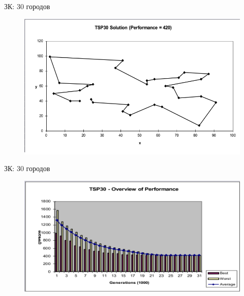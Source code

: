 \documentclass{beamer}
\begin{document}
\begin{frame}{ЗК: 30 городов}
\begin{figure}[h]
\centering
\includegraphics[scale=0.4]{images/lec04-pic46.png}
\end{figure}
\end{frame}

\begin{frame}{ЗК: 30 городов}
\begin{figure}[h]
\centering
\includegraphics[scale=0.4]{images/lec04-pic47.png}
\end{figure}
\end{frame}
\end{document}
